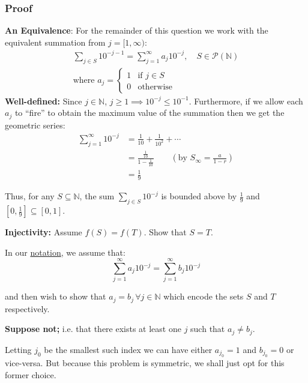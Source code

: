 \documentclass[dvipsnames,12pt]{exam}
\newcommand{\N}{{\mathbb{N}}}
\renewcommand{\P}{{\mathcal{P}}} %
\begin{document}
\subsubsection{Proof}
\textbf{An Equivalence}: For the remainder of this question we work with the equivalent summation from $j=[1,\infty)$:
\begin{equation}\label{notation}
    \begin{split}
    \sum_{j\in S}10^{-j-1} = \sum_{j=1}^\infty a_j 10^{-j}, \quad S \in \P(\N)\\
    \text{where } a_j = \begin{cases}
        1 & \text{if } j \in S\\
        0 & \text{otherwise}
    \end{cases}
\end{split}
\end{equation}
\textbf{Well-defined:} 
Since $j\in \N$, $j \geq 1 \implies 10^{-j} \leq 10^{-1}$. Furthermore, if we allow each $a_j$ to ``fire'' to obtain the maximum value of the summation then we get the geometric series:
\begin{align}
    \sum_{j=1}^\infty 10^{-j} &= \frac{1}{10} + \frac{1}{10^2} + \cdots \\
                              &= \frac{\frac{1}{10}}{1-\frac{1}{10}} \qquad(\text{by } S_\infty = \frac{a}{1-r}) \\
                              &= \frac{1}{9}
\end{align}

Thus, for any $S\subseteq \N$, the sum $\sum_{j\in S} 10^{-j}$ is bounded above by $\frac{1}{9}$ and $[0,\frac{1}{9}] \subseteq [0,1]$.

\bigskip
\textbf{Injectivity:} Assume $f(S) = f(T)$. Show that $S = T$.

In our \hyperref[notation]{notation}, we assume that: 
\begin{equation}
    \sum_{j=1}^\infty a_j 10^{-j} = \sum_{j=1}^\infty b_j 10^{-j}
\end{equation}

and then wish to show that $a_j = b_j \,\forall j \in \N$ which encode the sets $S$ and $T$ respectively.

\textbf{Suppose not;} i.e. that there exists at least one $j$ such that $a_j \neq b_j$.

Letting $j_0$ be the smallest such index we can have either $a_{j_0} = 1$ and $b_{j_0} = 0$ or vice-versa. But because this problem is symmetric, we shall just opt for this former choice.
\end{document}
